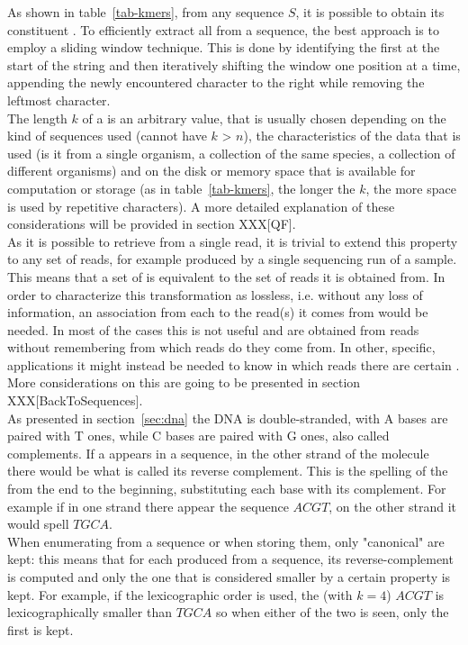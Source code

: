 As shown in table~\ref{tab-kmers}, from any sequence $S$, it is possible to obtain its constituent \kmers. To efficiently extract all \kmers from a sequence, the best approach is to employ a sliding window technique. This is done by identifying the first \kmer at the start of the string and then iteratively shifting the window one position at a time, appending the newly encountered character to the right while removing the leftmost character.\\ The length $k$ of a \kmer is an arbitrary value, that is usually chosen depending on the kind of sequences used (cannot have $k$ > $n$), the characteristics of the data that is used (is it from a single organism, a collection of the same species, a collection of different organisms) and on the disk or memory space that is available for computation or storage (as in table~\ref{tab-kmers}, the longer the $k$, the more space is used by repetitive characters). A more detailed explanation of these considerations will be provided in section XXX[QF].\\
As it is possible to retrieve \kmers from a single read, it is trivial to extend this property to any set of reads, for example produced by a single sequencing run of a sample. This means that a set of \kmers is equivalent to the set of reads it is obtained from. In order to characterize this transformation as lossless, i.e. without any loss of information, an association from each \kmer to the read(s) it comes from would be needed. In most of the cases this is not useful and \kmers are obtained from reads without remembering from which reads do they come from. In other, specific, applications it might instead be needed to know in which reads there are certain \kmers. More considerations on this are going to be presented in section XXX[BackToSequences].\\
As presented in section~\ref{sec:dna} the DNA is double-stranded, with A bases are paired with T ones, while C bases are paired with G ones, also called complements. If a \kmer appears in a sequence, in the other strand of the molecule there would be what is called its reverse complement. This is the spelling of the \kmer from the end to the beginning, substituting each base with its complement. For example if in one strand there appear the sequence $ACGT$, on the other strand it would spell $TGCA$.\\
When enumerating \kmers from a sequence or when storing them, only "canonical" \kmers are kept: this means that for each \kmer produced from a sequence, its reverse-complement is computed and only the one that is considered smaller by a certain property is kept. For example, if the lexicographic order is used, the \kmer (with $k=4$) $ACGT$ is lexicographically smaller than $TGCA$ so when either of the two is seen, only the first is kept.\\
